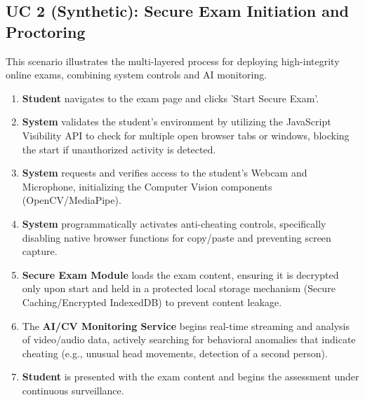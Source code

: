 \subsection{UC 2 (Synthetic): Secure Exam Initiation and Proctoring}
\label{subsec:uc2}
This scenario illustrates the multi-layered process for deploying high-integrity online exams, combining system controls and AI monitoring.
\begin{enumerate}
    \item \textbf{Student} navigates to the exam page and clicks 'Start Secure Exam'.
    \item \textbf{System} validates the student's environment by utilizing the JavaScript Visibility API to check for multiple open browser tabs or windows, blocking the start if unauthorized activity is detected.
    \item \textbf{System} requests and verifies access to the student's Webcam and Microphone, initializing the Computer Vision components (OpenCV/MediaPipe).
    \item \textbf{System} programmatically activates anti-cheating controls, specifically disabling native browser functions for copy/paste and preventing screen capture.
    \item \textbf{Secure Exam Module} loads the exam content, ensuring it is decrypted only upon start and held in a protected local storage mechanism (Secure Caching/Encrypted IndexedDB) to prevent content leakage.
    \item The \textbf{AI/CV Monitoring Service} begins real-time streaming and analysis of video/audio data, actively searching for behavioral anomalies that indicate cheating (e.g., unusual head movements, detection of a second person).
    \item \textbf{Student} is presented with the exam content and begins the assessment under continuous surveillance.
\end{enumerate}


